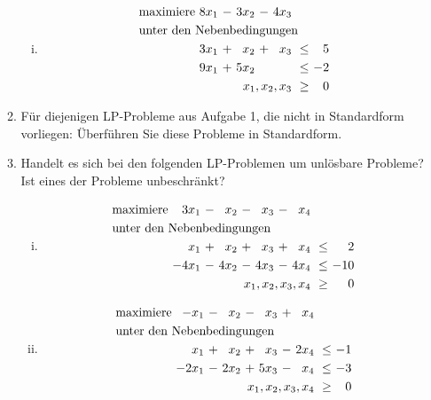 \documentclass[10pt, a4paper]{article}
\begin{document}
\begin{enumerate}[\bfseries A:]
\begin{enumerate}[\bfseries 1.]
\begin{enumerate}[(i)]
\item \begin{align*}
\begin{alignedat}{5}
& \text{maximiere } & 8x_1 &\ - &\ 3x_2 &\ - &\ 4x_3 & & \\
& \rlap{unter den Nebenbedingungen} & & & & & & & \\
&& 3x_1 &\ + &\  x_2 &\ + &\  x_3 &\ \leq &\  5 \\
&& 9x_1 &\ + &\ 5x_2 &    &       &\ \leq &\ -2 \\
&& & & & & \llap{$x_1, x_2, x_3$} &\ \geq &\ 0
\end{alignedat}
\end{align*}
\end{enumerate}


\item Für diejenigen LP-Probleme aus Aufgabe 1, die nicht in Standardform vorliegen: Überführen Sie diese Probleme in Standardform.


\item Handelt es sich bei den folgenden LP-Problemen um unlösbare Probleme? Ist eines der Probleme unbeschränkt?
\begin{enumerate}[(i)]
\item \begin{align*}
\begin{alignedat}{6}
& \text{maximiere } & 3x_1 &\ - &\ x_2 &\ - &\ x_3 &\ - &\ x_4 & & \\
& \rlap{unter den Nebenbedingungen} & & & & & & & & & \\
&&   x_1 &\ + &\  x_2 &\ + &\  x_3 &\ + &\  x_4 &\ \leq &\   2 \\
&& -4x_1 &\ - &\ 4x_2 &\ - &\ 4x_3 &\ - &\ 4x_4 &\ \leq &\ -10 \\
&& & & & & & & \llap{$x_1, x_2, x_3, x_4$} &\ \geq &\ 0
\end{alignedat}
\end{align*}

\item \begin{align*}
\begin{alignedat}{6}
& \text{maximiere } & -x_1 &\ - &\ x_2 &\ - &\ x_3 &\ + &\ x_4 & & \\
& \rlap{unter den Nebenbedingungen} & & & & & & & & & \\
&&   x_1 &\ + &\  x_2 &\ + &\  x_3 &\ - &\ 2x_4 &\ \leq &\ -1 \\
&& -2x_1 &\ - &\ 2x_2 &\ + &\ 5x_3 &\ - &\  x_4 &\ \leq &\ -3 \\
&& & & & & & & \llap{$x_1, x_2, x_3, x_4$} &\ \geq &\ 0
\end{alignedat}
\end{align*}
\end{enumerate}



\end{enumerate}
\end{enumerate}
\end{document}
